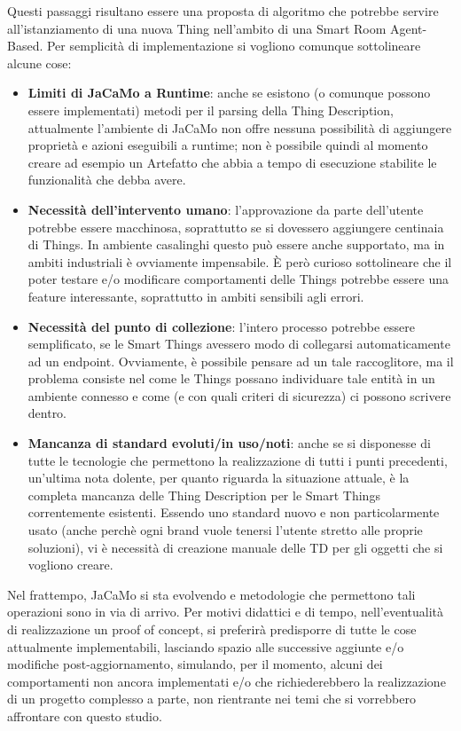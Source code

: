 \documentclass[12pt,a4paper,openright,oneside]{report}
\begin{document}
Questi passaggi risultano essere una proposta di algoritmo che potrebbe servire all'istanziamento di una nuova Thing nell'ambito di una Smart Room Agent-Based. Per semplicità di implementazione si vogliono comunque sottolineare alcune cose:

\begin{itemize}
	\item \textbf{Limiti di JaCaMo a Runtime}: anche se esistono (o comunque possono essere implementati) metodi per il parsing della Thing Description, attualmente l'ambiente di JaCaMo non offre nessuna possibilità di aggiungere proprietà e azioni eseguibili a runtime; non è possibile quindi al momento creare ad esempio un Artefatto che abbia a tempo di esecuzione stabilite le funzionalità che debba avere.
	
	\item \textbf{Necessità dell'intervento umano}: l'approvazione da parte dell'utente potrebbe essere macchinosa, soprattutto se si dovessero aggiungere centinaia di Things. In ambiente casalinghi questo può essere anche supportato, ma in ambiti industriali è ovviamente impensabile. È però curioso sottolineare che il poter testare e/o modificare comportamenti delle Things potrebbe essere una feature interessante, soprattutto in ambiti sensibili agli errori.
	
	\item \textbf{Necessità del punto di collezione}: l'intero processo potrebbe essere semplificato, se le Smart Things avessero modo di collegarsi automaticamente ad un endpoint. Ovviamente, è possibile pensare ad un tale raccoglitore, ma il problema consiste nel come le Things possano individuare tale entità in un ambiente connesso e come (e con quali criteri di sicurezza) ci possono scrivere dentro.
	
	\item \textbf{Mancanza di standard evoluti/in uso/noti}: anche se si disponesse di tutte le tecnologie che permettono la realizzazione di tutti i punti precedenti, un'ultima nota dolente, per quanto riguarda la situazione attuale, è la completa mancanza delle Thing Description per le Smart Things correntemente esistenti. Essendo uno standard nuovo e non particolarmente usato (anche perchè ogni brand vuole tenersi l'utente stretto alle proprie soluzioni), vi è necessità di creazione manuale delle TD per gli oggetti che si vogliono creare.
\end{itemize}


Nel frattempo, JaCaMo si sta evolvendo e metodologie che permettono tali operazioni sono in via di arrivo. Per motivi didattici e di tempo, nell'eventualità di realizzazione un proof of concept, si preferirà predisporre di tutte le cose attualmente implementabili, lasciando spazio alle successive aggiunte e/o modifiche post-aggiornamento, simulando, per il momento, alcuni dei comportamenti non ancora implementati e/o che richiederebbero la realizzazione di un progetto complesso a parte, non rientrante nei temi che si vorrebbero affrontare con questo studio.
\end{document}
